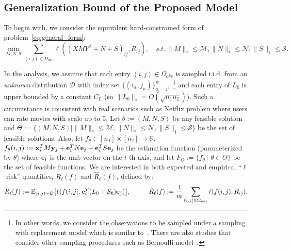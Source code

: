 \documentclass[twoside,11pt]{article}
\def\be{{\bf e}}
\def\bx{{\bf x}}
\def\by{{\bf y}}
\def\R{\mathbb{R}}
\def\Obs{\Omega_{obs}}
\def\dist{{\mathcal D}}
\newcommand\Ex[2]{{\mathbb E}_{#1}\big[#2\big]}
\def\mmax{{\mathcal M}}
\def\nmax{{\mathcal N}}
\def\smax{{\mathcal S}}
\def\realL{L_0}
\def\realS{S_0}
\begin{document}
\subsection{Generalization Bound of the Proposed Model}
\label{subsec:generalization}
To begin with, we consider the equivalent hard-constrained form of problem~\eqref{eq:general_form}:
\begin{equation}
  \min_{M, N, S} \sum_{(i, j) \in \Obs} \ell((XMY^T + N + S)_{ij}, R_{ij}), \quad
  s.t. \ \|M\|_* \leq \mmax, \|N\|_* \leq \nmax, \|S\|_1 \leq \smax.
  \label{eq:general_form_hard}
\end{equation}

In the analysis, we assume that each entry $(i,j) \in \Obs$ is sampled
i.i.d. from an {\it unknown} distribution $\dist$ with index set $\{(i_\alpha, j_\alpha)\}_{\alpha=1}^m$,~\footnote{In other words, we consider the observations to be sampled under a
sampling with replacement model which is similar to~\citet{Recht11a, Shamir14a}.
There are also studies that consider other sampling procedures
such as Bernoulli model~\citep{Candes09a, Candes12a}.}
and each entry of $\realL$ is upper bounded by a constant $C_L$
(so $\|\realL\|_* = O(\sqrt{n_1n_2})$).
Such a circumstance is consistent with
real scenarios such as Netflix problem where users can rate movies with scale up to $5$.
Let $\theta := (M, N, S)$ be any feasible solution and
$\Theta := \{(M,N,S)\mid\|M\|_* \leq \mmax, \|N\|_* \leq \nmax, \|S\|_1 \leq \smax\}$ be the set of feasible solutions.
Also, let $f_{\theta} \in [n_1] \times [n_2] \rightarrow \R$,
$f_{\theta}(i,j) := \bx_i^TM\by_j + \be_i^TN\be_j + \be_i^TS\be_j$ be the estimation function
(parameterized by $\theta$) where $\be_t$ is the unit vector on the $t$-th axis, and let
$F_{\Theta} := \{f_\theta \mid \theta\in\Theta\}$ be the set of feasible functions.
We are interested in both expected and empirical ``$\ell$-risk'' quantities,
$R_\ell(f)$ and $\hat{R}_\ell(f)$, defined by:
\begin{equation*}
  R_\ell(f) := \Ex{(i, j)\sim\dist}{\ell(f(i, j), \be_i^T (\realL + \realS) \be_j)}, \hspace{1cm}
  \hat{R}_\ell(f) := \frac{1}{m} \sum_{(i,j)\in \Obs} \ell(f(i, j), R_{ij}).
\end{equation*}
\end{document}
